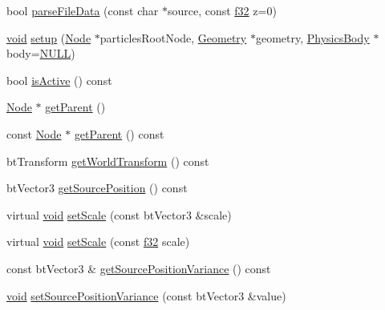 \begin{DoxyCompactItemize}
\item 
bool \mbox{\hyperlink{classnjli_1_1_particle_emitter_ad64b84036b876f4d16a9f431d5644d90}{parse\+File\+Data}} (const char $\ast$source, const \mbox{\hyperlink{_util_8h_a5f6906312a689f27d70e9d086649d3fd}{f32}} z=0)
\item 
\mbox{\hyperlink{_thread_8h_af1e856da2e658414cb2456cb6f7ebc66}{void}} \mbox{\hyperlink{classnjli_1_1_particle_emitter_a0c4d0379f8b2827b74a5f62cb8755a6b}{setup}} (\mbox{\hyperlink{classnjli_1_1_node}{Node}} $\ast$particles\+Root\+Node, \mbox{\hyperlink{classnjli_1_1_geometry}{Geometry}} $\ast$geometry, \mbox{\hyperlink{classnjli_1_1_physics_body}{Physics\+Body}} $\ast$body=\mbox{\hyperlink{_util_8h_a070d2ce7b6bb7e5c05602aa8c308d0c4}{N\+U\+LL}})
\item 
bool \mbox{\hyperlink{classnjli_1_1_particle_emitter_a1f1b6f8ad353f240fc89e9d4febbcdae}{is\+Active}} () const
\item 
\mbox{\hyperlink{classnjli_1_1_node}{Node}} $\ast$ \mbox{\hyperlink{classnjli_1_1_particle_emitter_a3eee4d6a09c2516ee09fe07529c258e8}{get\+Parent}} ()
\item 
const \mbox{\hyperlink{classnjli_1_1_node}{Node}} $\ast$ \mbox{\hyperlink{classnjli_1_1_particle_emitter_a1bb095000e8c08a2e09598e50b85e0cc}{get\+Parent}} () const
\item 
bt\+Transform \mbox{\hyperlink{classnjli_1_1_particle_emitter_a7376b63782edf2010d75abf77ef087ff}{get\+World\+Transform}} () const
\item 
bt\+Vector3 \mbox{\hyperlink{classnjli_1_1_particle_emitter_ae569369da180a03372f3f0508386ca04}{get\+Source\+Position}} () const
\item 
virtual \mbox{\hyperlink{_thread_8h_af1e856da2e658414cb2456cb6f7ebc66}{void}} \mbox{\hyperlink{classnjli_1_1_particle_emitter_ac709de0745b9ccf90a2d681d9e49c1a3}{set\+Scale}} (const bt\+Vector3 \&scale)
\item 
virtual \mbox{\hyperlink{_thread_8h_af1e856da2e658414cb2456cb6f7ebc66}{void}} \mbox{\hyperlink{classnjli_1_1_particle_emitter_a06720872c8a4b3fd17d8771887ed30b3}{set\+Scale}} (const \mbox{\hyperlink{_util_8h_a5f6906312a689f27d70e9d086649d3fd}{f32}} scale)
\item 
const bt\+Vector3 \& \mbox{\hyperlink{classnjli_1_1_particle_emitter_a7706a548b6fea88ce6ac6426066725fa}{get\+Source\+Position\+Variance}} () const
\item 
\mbox{\hyperlink{_thread_8h_af1e856da2e658414cb2456cb6f7ebc66}{void}} \mbox{\hyperlink{classnjli_1_1_particle_emitter_a26ca2463d9cc86ffcab132a54e86a930}{set\+Source\+Position\+Variance}} (const bt\+Vector3 \&value)

\end{DoxyCompactItemize}
